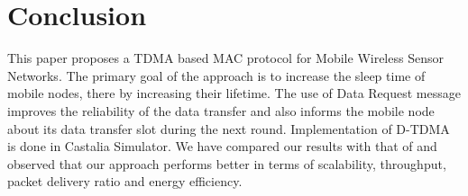 \documentclass[a4paper, conference, 10pt]{IEEEtran}
\begin{document}
\section{Conclusion}
\label{conclusion}
This paper proposes a TDMA based MAC protocol for Mobile Wireless Sensor Networks. The primary goal of the approach is to increase the sleep time of mobile nodes, there by increasing their lifetime. The use of Data Request message improves the reliability of the data transfer and also informs the mobile node about its data transfer slot during the next round. Implementation of D-TDMA is done in Castalia Simulator. We have compared our results with that of \cite{hmac} and observed that our approach performs better in terms of scalability, throughput, packet delivery ratio and energy efficiency.



\end{document}
